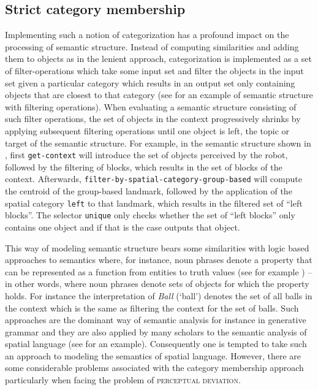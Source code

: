 \subsection{Strict category membership}
Implementing such a notion of categorization has a profound 
impact on the processing of semantic structure. Instead of computing 
similarities and adding them to objects as in the lenient approach, categorization 
is implemented as a set of filter-operations which take some input set and filter the 
objects in the input set given a particular category which results in an 
output set only containing objects that are closest to that category (see 
 for an example of semantic structure with 
filtering operations). When evaluating a semantic structure
consisting of such filter operations, the set of objects in the context progressively
shrinks by applying subsequent filtering operations until one object is left, 
the topic or target of the semantic structure. For example, 
in the semantic structure shown in , first
{\footnotesize\tt get-context} will introduce the set of objects perceived by
the robot, followed by the filtering of blocks, which results in the
set of blocks of the context. Afterwards, 
{\footnotesize\tt filter-by-spatial-category-group-based} will compute the centroid
of the group-based landmark, followed by the application of the 
spatial category {\footnotesize\tt left} to that landmark, which results in the
filtered set of ``left blocks''. The selector {\footnotesize\tt unique} only
checks whether the set of ``left blocks'' only contains one
object and if that is the case outputs that object.

This way of modeling semantic structure bears some similarities with
logic based approaches to semantics where, for instance, noun phrases denote a 
property that can be represented as a function from entities to truth 
values (see for example \citealp{barwise1981generalized}) -- in other words, where noun phrases denote sets of objects for which
the property holds. For instance the interpretation of \textit{Ball} (`ball') denotes 
the set of all balls in the context which is the same as filtering the context
for the set of balls. Such approaches are the dominant way of semantic
analysis for instance in generative grammar and they are also applied 
by many scholars to the semantic analysis of spatial language (see 
\citealp{eschenbach1997axiomatic} for an example). Consequently
one is tempted to take such an approach to modeling the semantics
of spatial language. However, there are some considerable problems
associated with the category membership approach particularly when 
facing the problem of \textsc{perceptual deviation}.

